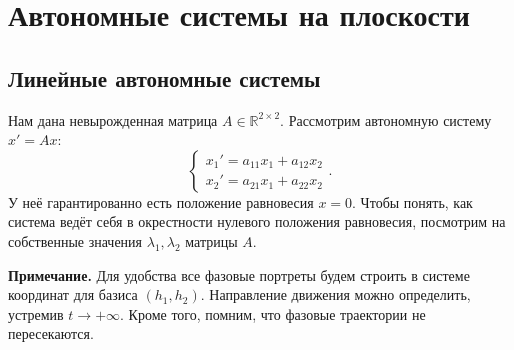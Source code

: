 



\setcounter{equation}{0}
\section{Автономные системы на плоскости}
\subsection{Линейные автономные системы}
Нам дана невырожденная матрица $A \in \mathbb{R}^{2 \times 2}$. Рассмотрим автономную систему $x' = Ax$:
\begin{equation}
    \begin{cases}
        x_1' = a_{11} x_1 + a_{12} x_2 \\
        x_2' = a_{21} x_1 + a_{22} x_2
    \end{cases}.
\end{equation}
У неё гарантированно есть положение равновесия $x = 0$. Чтобы понять, как система ведёт себя в окрестности нулевого положения равновесия, посмотрим на собственные значения $\lambda_1, \lambda_2$ матрицы $A$.

\textbf{Примечание.} Для удобства все фазовые портреты будем строить в системе координат для базиса $(h_1, h_2)$. Направление движения можно определить, устремив $t \to +\infty$. Кроме того, помним, что фазовые траектории не пересекаются.


